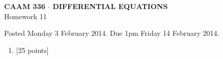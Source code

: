 \documentclass[10pt]{article}
\begin{document}
\vspace*{-5em}
\begin{center}
\large \textsf{\textbf{CAAM 336 $\cdot$ DIFFERENTIAL EQUATIONS}\\[0.5em]
Homework 11 }
\end{center}

Posted Monday 3 February 2014. Due 1pm Friday 14 February 2014.

\begin{enumerate}\addtocounter{enumi}{10}
\item {[25 points]}\\  

\end{enumerate}
\end{document}
